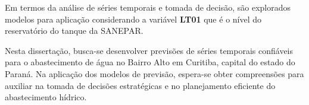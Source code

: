 Em termos da análise de séries temporais e tomada de decisão, são explorados modelos para aplicação considerando a variável \textbf{LT01} que é o nível do reservatório do tanque da SANEPAR.

Nesta dissertação, busca-se desenvolver previsões de séries temporais confiáveis para o abastecimento de água no Bairro Alto em Curitiba, capital do estado do Paraná. Na aplicação dos modelos de previsão, espera-se obter compreensões para auxiliar na tomada de decisões estratégicas e no planejamento eficiente do abastecimento hídrico.


          

   

    

    

    